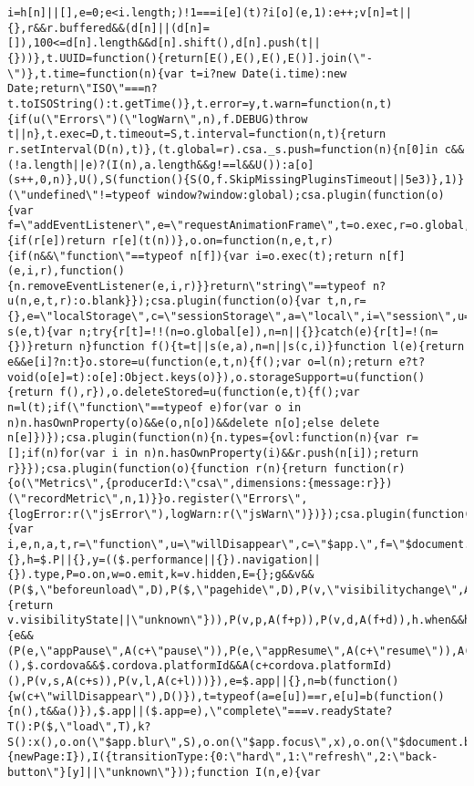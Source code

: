 \documentclass[
]{article}
\begin{document}
\begin{verbatim}
i=h[n]||[],e=0;e<i.length;)!1===i[e](t)?i[o](e,1):e++;v[n]=t||{},r&&r.buffered&&(d[n]||(d[n]=[]),100<=d[n].length&&d[n].shift(),d[n].push(t||{}))},t.UUID=function(){return[E(),E(),E(),E()].join(\"-\")},t.time=function(n){var t=i?new Date(i.time):new Date;return\"ISO\"===n?t.toISOString():t.getTime()},t.error=y,t.warn=function(n,t){if(u(\"Errors\")(\"logWarn\",n),f.DEBUG)throw t||n},t.exec=D,t.timeout=S,t.interval=function(n,t){return r.setInterval(D(n),t)},(t.global=r).csa._s.push=function(n){n[0]in c&&(!a.length||e)?(I(n),a.length&&g!==l&&U()):a[o](s++,0,n)},U(),S(function(){S(O,f.SkipMissingPluginsTimeout||5e3)},1)}(\"undefined\"!=typeof window?window:global);csa.plugin(function(o){var f=\"addEventListener\",e=\"requestAnimationFrame\",t=o.exec,r=o.global,u=o.on;o.raf=function(n){if(r[e])return r[e](t(n))},o.on=function(n,e,t,r){if(n&&\"function\"==typeof n[f]){var i=o.exec(t);return n[f](e,i,r),function(){n.removeEventListener(e,i,r)}}return\"string\"==typeof n?u(n,e,t,r):o.blank}});csa.plugin(function(o){var t,n,r={},e=\"localStorage\",c=\"sessionStorage\",a=\"local\",i=\"session\",u=o.exec;function s(e,t){var n;try{r[t]=!!(n=o.global[e]),n=n||{}}catch(e){r[t]=!(n={})}return n}function f(){t=t||s(e,a),n=n||s(c,i)}function l(e){return e&&e[i]?n:t}o.store=u(function(e,t,n){f();var o=l(n);return e?t?void(o[e]=t):o[e]:Object.keys(o)}),o.storageSupport=u(function(){return f(),r}),o.deleteStored=u(function(e,t){f();var n=l(t);if(\"function\"==typeof e)for(var o in n)n.hasOwnProperty(o)&&e(o,n[o])&&delete n[o];else delete n[e]})});csa.plugin(function(n){n.types={ovl:function(n){var r=[];if(n)for(var i in n)n.hasOwnProperty(i)&&r.push(n[i]);return r}}});csa.plugin(function(o){function r(n){return function(r){o(\"Metrics\",{producerId:\"csa\",dimensions:{message:r}})(\"recordMetric\",n,1)}}o.register(\"Errors\",{logError:r(\"jsError\"),logWarn:r(\"jsWarn\")})});csa.plugin(function(o){var i,e,n,a,t,r=\"function\",u=\"willDisappear\",c=\"$app.\",f=\"$document.\",p=\"focus\",d=\"blur\",s=\"active\",l=\"resign\",$=o.global,b=o.exec,m=o(\"Events\"),g=$.location,v=$.document||{},h=$.P||{},y=(($.performance||{}).navigation||{}).type,P=o.on,w=o.emit,k=v.hidden,E={};g&&v&&(P($,\"beforeunload\",D),P($,\"pagehide\",D),P(v,\"visibilitychange\",A(f,function(){return v.visibilityState||\"unknown\"})),P(v,p,A(f+p)),P(v,d,A(f+d)),h.when&&h.when(\"mash\").execute(function(e){e&&(P(e,\"appPause\",A(c+\"pause\")),P(e,\"appResume\",A(c+\"resume\")),A(c+\"deviceready\")(),$.cordova&&$.cordova.platformId&&A(c+cordova.platformId)(),P(v,s,A(c+s)),P(v,l,A(c+l)))}),e=$.app||{},n=b(function(){w(c+\"willDisappear\"),D()}),t=typeof(a=e[u])==r,e[u]=b(function(){n(),t&&a()}),$.app||($.app=e),\"complete\"===v.readyState?T():P($,\"load\",T),k?S():x(),o.on(\"$app.blur\",S),o.on(\"$app.focus\",x),o.on(\"$document.blur\",S),o.on(\"$document.focus\",x),o.on(\"$document.hidden\",S),o.on(\"$document.visible\",x),o.register(\"SPA\",{newPage:I}),I({transitionType:{0:\"hard\",1:\"refresh\",2:\"back-button\"}[y]||\"unknown\"}));function I(n,e){var 
\end{verbatim}
\end{document}
